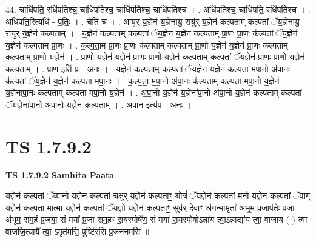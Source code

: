 \documentclass[17pt]{extarticle}
\begin{document}
44. चाधि॑पति॒ रधि॑पतिश्च॒ चाधि॑पतिश्च॒ चाधि॑पतिश्च॒ चाधि॑पतिश्च । . अधि॑पतिश्च॒ चाधि॑पति॒ रधि॑पतिश्च । . अधि॑पति॒रित्यधि॑ - प॒तिः॒ । . चेति॑ च । . आयु॑र् य॒ज्ञेन॑ य॒ज्ञेनायु॒ रायु॑र् य॒ज्ञेन॑ कल्पताम् कल्पतां ॅय॒ज्ञेनायु॒ रायु॑र् य॒ज्ञेन॑ कल्पताम् । . य॒ज्ञेन॑ कल्पताम् कल्पतां ॅय॒ज्ञेन॑ य॒ज्ञेन॑ कल्पताम् प्रा॒णः प्रा॒णः क॑ल्पतां ॅय॒ज्ञेन॑ य॒ज्ञेन॑ कल्पताम् प्रा॒णः । . क॒ल्प॒ता॒म् प्रा॒णः प्रा॒णः क॑ल्पताम् कल्पताम् प्रा॒णो य॒ज्ञेन॑ य॒ज्ञेन॑ प्रा॒णः क॑ल्पताम् कल्पताम् प्रा॒णो य॒ज्ञेन॑ । . प्रा॒णो य॒ज्ञेन॑ य॒ज्ञेन॑ प्रा॒णः प्रा॒णो य॒ज्ञेन॑ कल्पताम् कल्पतां ॅय॒ज्ञेन॑ प्रा॒णः प्रा॒णो य॒ज्ञेन॑ कल्पताम् । . प्रा॒ण इति॑ प्र - अ॒नः । . य॒ज्ञेन॑ कल्पताम् कल्पतां ॅय॒ज्ञेन॑ य॒ज्ञेन॑ कल्पता मपा॒नो अ॑पा॒नः क॑ल्पतां ॅय॒ज्ञेन॑ य॒ज्ञेन॑ कल्पता मपा॒नः । . क॒ल्प॒ता॒ म॒पा॒नो अ॑पा॒नः क॑ल्पताम् कल्पता मपा॒नो य॒ज्ञेन॑ य॒ज्ञेना॑पा॒नः क॑ल्पताम् कल्पता मपा॒नो य॒ज्ञेन॑ । . अ॒पा॒नो य॒ज्ञेन॑ य॒ज्ञेना॑पा॒नो अ॑पा॒नो य॒ज्ञेन॑ कल्पताम् कल्पतां ॅय॒ज्ञेना॑पा॒नो अ॑पा॒नो य॒ज्ञेन॑ कल्पताम् । . अ॒पा॒न इत्य॑प - अ॒नः । \newline
\pagebreak
{}

\section{ TS 1.7.9.2 }

\textbf{TS 1.7.9.2 } \newline
\textbf{Samhita Paata} \newline

य॒ज्ञेन॑ कल्पतां ॅव्या॒नो य॒ज्ञेन॑ कल्पतां॒ चक्षु॑र् य॒ज्ञेन॑ कल्पताꣳ॒॒ श्रोत्रं॑ ॅय॒ज्ञेन॑ कल्पतां॒ मनो॑ य॒ज्ञेन॑ कल्पतां॒ ॅवाग् य॒ज्ञेन॑ कल्पता-मा॒त्मा य॒ज्ञेन॑ कल्पतां ॅय॒ज्ञो य॒ज्ञेन॑ कल्पताꣳ॒॒ सुव॑र् दे॒वाꣳ अ॑गन्मा॒मृता॑ अभूम प्र॒जाप॑तेः प्र॒जा अ॑भूम॒ सम॒हं प्र॒जया॒ सं मया᳚ प्र॒जा सम॒हꣳ रा॒यस्पोषे॑ण॒ सं मया॑ रा॒यस्पोषोऽन्ना॑य त्वा॒ऽन्नाद्या॑य त्वा॒ वाजा॑य ( ) त्वा वाजजि॒त्यायै᳚ त्वा॒ ऽमृत॑मसि॒ पुष्टि॑रसि प्र॒जन॑नमसि ॥ \newline
\end{document}
